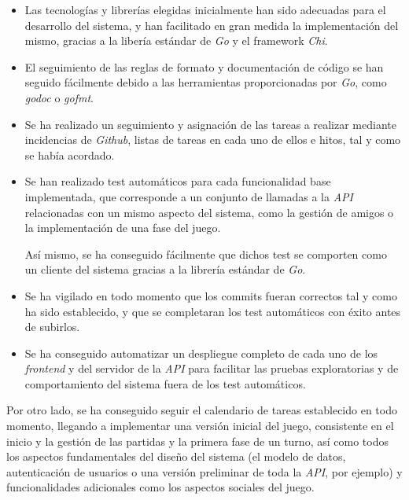 \documentclass[11pt, a4paper, titlepage]{article}
\begin{document}
\begin{itemize}
    \item Las tecnologías y librerías elegidas inicialmente han sido adecuadas para el desarrollo del sistema, y han facilitado en gran medida la implementación del mismo, gracias a la libería estándar de \textit{Go} y el framework \textit{Chi}.

    \item El seguimiento de las reglas de formato y documentación de código se han seguido fácilmente debido a las herramientas proporcionadas por \textit{Go}, como \textit{godoc} o \textit{gofmt}.

    \item Se ha realizado un seguimiento y asignación de las tareas a realizar mediante incidencias de \textit{Github},  listas de tareas en cada uno de ellos e hitos, tal y como se había acordado.

    \item Se han realizado test automáticos para cada funcionalidad base implementada, que corresponde a un conjunto de llamadas a la \textit{API} relacionadas con un mismo aspecto del sistema, como la gestión de amigos o la implementación de una fase del juego.

    Así mismo, se ha conseguido fácilmente que dichos test se comporten como un cliente del sistema gracias a la librería estándar de \textit{Go}.

    \item Se ha vigilado en todo momento que los commits fueran correctos tal y como ha sido establecido, y que se completaran los test automáticos con éxito antes de subirlos.

    \item Se ha conseguido automatizar un despliegue completo de cada uno de los \textit{frontend} y del servidor de la \textit{API} para facilitar las pruebas exploratorias y de comportamiento del sistema fuera de los test automáticos.
\end{itemize}


Por otro lado, se ha conseguido seguir el calendario de tareas establecido en todo momento, llegando a implementar una versión inicial del juego, consistente en el inicio y la gestión de las partidas y la primera fase de un turno, así como todos los aspectos fundamentales del diseño del sistema (el modelo de datos, autenticación de usuarios o una versión preliminar de toda la \textit{API}, por ejemplo) y funcionalidades adicionales como los aspectos sociales del juego.\\
\end{document}
